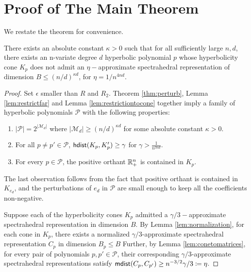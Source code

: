 \section{Proof of The Main Theorem}
We restate the theorem for convenience.
\begin{theorem} \label{thm:main}
There exists an absolute constant $\kappa > 0$ such that for all sufficiently large $n, d$, 
there exists an n-variate degree $d$ hyperbolic polynomial $p$ whose hyperbolicity cone $K_p$ does not admit an $\eta-$approximate spectrahedral representation of dimension $B \leq \left(n/ d\right)^{\kappa d}$, for $\eta=1/n^{4nd}$. 
\end{theorem}


\begin{proof} Set $\epsilon$ smaller than $R$ and $R_2$.
Theorem \ref{thm:perturb}, Lemma \ref{lem:restrictfar} and Lemma \ref{lem:restrictiontocone}
  together imply a family of hyperbolic polynomials $\mathcal{P}$ with the following properties:
\begin{enumerate}
	\item $|\mathcal{P}| = 2^{|\mathcal{M}_d|}$ where $|\mathcal{M}_d | \geq (n/d)^{\kappa d}$ for some absolute constant $\kappa > 0$.        
    
    \item For all $p \neq p' \in \mathcal{P}$, $\mathsf{hdist}(K_p,K_p') \geq \gamma$ for $\gamma > \frac{1}{n^{3nd}}$.
    
    \item For every $p \in \mathcal{P}$, the positive orthant $\mathbb{R}_+^n$ is contained in $K_p$.
    \end{enumerate}
The last observation follows from the fact that positive orthant is contained in $K_{e_d}$, and the perturbations of $e_d$ in $\mathcal{P}$ are small enough to keep all the coefficients non-negative.

Suppose each of the hyperbolicity cones $K_p$ admitted a $\gamma/3-$approximate spectrahedral representation in dimension $B$.  By Lemma \ref{lem:normalization}, for each cone in $K_p$, there exists a normalized $\gamma/3$-approximate spectrahedral representation $C_p$ in dimension $B_p \leq B$
	Further, by Lemma \ref{lem:conetomatrices}, for every pair of polynomials $p, p' \in \mathcal{P}$, their corresponding $\gamma/3$-approximate spectrahedral representations satisfy $\mathsf{mdist}(C_p, C_{p'}) \geq n^{-3/2} \gamma/3 \coloneqq \eta$.  


\end{proof}

